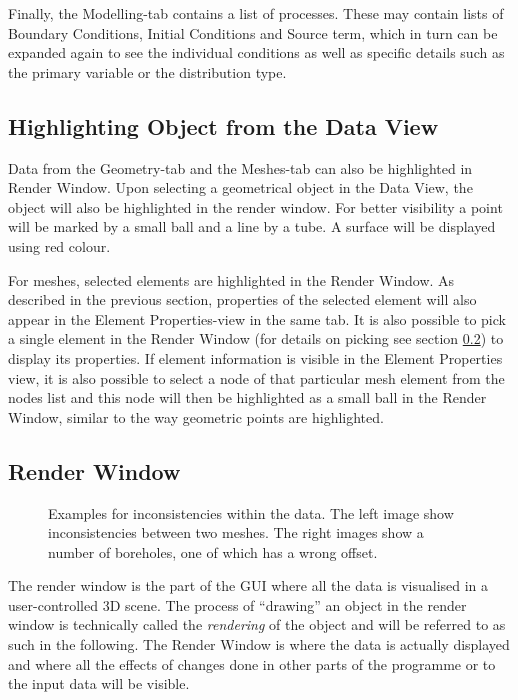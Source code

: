 Finally, the Modelling-tab contains a list of processes. These may contain lists of Boundary Conditions, Initial Conditions and Source term, which in turn can be expanded again to see the individual conditions as well as specific details such as the primary variable or the distribution type.


\subsection{Highlighting Object from the Data View}

Data from the Geometry-tab and the Meshes-tab can also be highlighted in Render Window. Upon selecting a geometrical object in the Data View, the object will also be highlighted in the render window. For better visibility a point will be marked by a small ball and a line by a tube. A surface will be displayed using red colour.

For meshes, selected elements are highlighted in the Render Window. As described in the previous section, properties of the selected element will also appear in the Element Properties-view in the same tab. It is also possible to pick a single element in the Render Window (for details on picking see section \ref{RenderWindow}) to display its properties. If element information is visible in the Element Properties view, it is also possible to select a node of that particular mesh element from the nodes list and this node will then be highlighted as a small ball in the Render Window, similar to the way geometric points are highlighted.


\subsection{Render Window}
\label{RenderWindow}

\begin{figure}[tb]
\begin{center}
\enspace
{}
\end{center}
\caption{Examples for inconsistencies within the data. The left image show inconsistencies between two meshes. The right images show a number of boreholes, one of which has a wrong offset.} \label{fig:error}
\end{figure}

The render window is the part of the GUI where all the data is visualised in a user-controlled 3D scene. The process of ``drawing'' an object in the render window is technically called the \emph{rendering} of the object and will be referred to as such in the following. The Render Window is where the data is actually displayed and where all the effects of changes done in other parts of the programme or to the input data will be visible.


